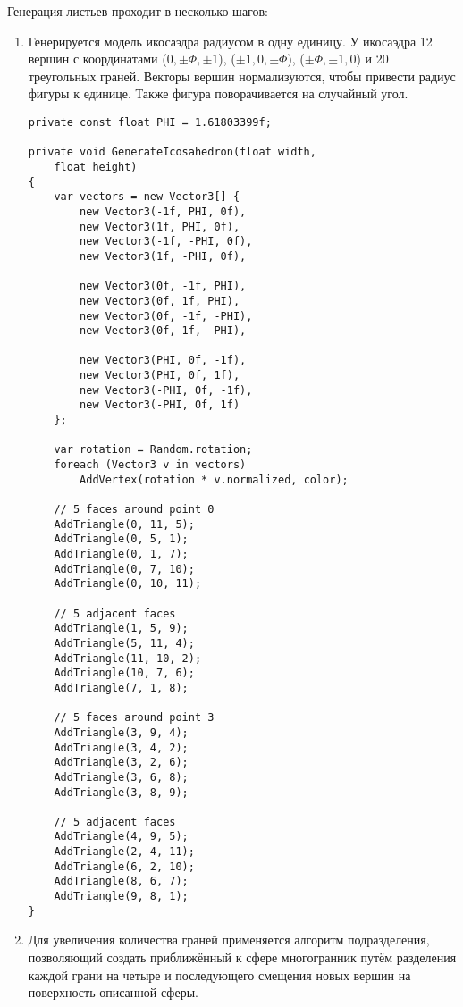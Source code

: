 Генерация листьев проходит в несколько шагов:
\begin{enumerate}
\item Генерируется модель икосаэдра радиусом в одну единицу. У икосаэдра 12 вершин с координатами 
(\texttt{\(0, \pm\Phi, \pm1\)}), 
(\texttt{\(\pm1, 0, \pm\Phi\)}), 
(\texttt{\(\pm\Phi, \pm1, 0\)}) и 20 треугольных граней.\cite{IcosahedronMath}
Векторы вершин нормализуются, чтобы привести радиус фигуры к единице. Также фигура поворачивается на случайный угол.
 
\begin{lstlisting}
private const float PHI = 1.61803399f;

private void GenerateIcosahedron(float width,
    float height)
{
    var vectors = new Vector3[] {
        new Vector3(-1f, PHI, 0f),
        new Vector3(1f, PHI, 0f),
        new Vector3(-1f, -PHI, 0f),
        new Vector3(1f, -PHI, 0f),

        new Vector3(0f, -1f, PHI),
        new Vector3(0f, 1f, PHI),
        new Vector3(0f, -1f, -PHI),
        new Vector3(0f, 1f, -PHI),

        new Vector3(PHI, 0f, -1f),
        new Vector3(PHI, 0f, 1f),
        new Vector3(-PHI, 0f, -1f),
        new Vector3(-PHI, 0f, 1f)
    };

    var rotation = Random.rotation;
    foreach (Vector3 v in vectors) 
        AddVertex(rotation * v.normalized, color);

    // 5 faces around point 0
    AddTriangle(0, 11, 5);
    AddTriangle(0, 5, 1);
    AddTriangle(0, 1, 7);
    AddTriangle(0, 7, 10);
    AddTriangle(0, 10, 11);

    // 5 adjacent faces 
    AddTriangle(1, 5, 9);
    AddTriangle(5, 11, 4);
    AddTriangle(11, 10, 2);
    AddTriangle(10, 7, 6);
    AddTriangle(7, 1, 8);

    // 5 faces around point 3
    AddTriangle(3, 9, 4);
    AddTriangle(3, 4, 2);
    AddTriangle(3, 2, 6);
    AddTriangle(3, 6, 8);
    AddTriangle(3, 8, 9);

    // 5 adjacent faces 
    AddTriangle(4, 9, 5);
    AddTriangle(2, 4, 11);
    AddTriangle(6, 2, 10);
    AddTriangle(8, 6, 7);
    AddTriangle(9, 8, 1);
}
\end{lstlisting}

\item Для увеличения количества граней применяется алгоритм подразделения\cite{subdivision}, позволяющий создать приближённый к сфере многогранник путём разделения каждой грани на четыре и последующего смещения новых вершин на поверхность описанной сферы.
 

\end{enumerate}
